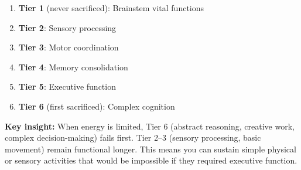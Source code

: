 \begin{keypoint}
\begin{enumerate}
    \item \textbf{Tier 1} (never sacrificed): Brainstem vital functions
    \item \textbf{Tier 2}: Sensory processing
    \item \textbf{Tier 3}: Motor coordination
    \item \textbf{Tier 4}: Memory consolidation
    \item \textbf{Tier 5}: Executive function
    \item \textbf{Tier 6} (first sacrificed): Complex cognition
\end{enumerate}

\textbf{Key insight:} When energy is limited, Tier 6 (abstract reasoning, creative work, complex decision-making) fails first. Tier 2--3 (sensory processing, basic movement) remain functional longer. This means you can sustain simple physical or sensory activities that would be impossible if they required executive function.
\end{keypoint}

